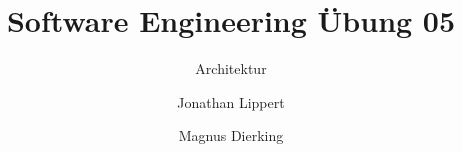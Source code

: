 \documentclass[
	ngerman,
	twoside,
	pdfa=false,
	ruledheaders=section,%
	class=report,%
	thesis={type=Übung},%
	accentcolor=TUDa-9d,%
	custommargins=false,%
	marginpar=false,%
	parskip=half-,%
	fontsize=11pt,%
]{tudapub}
\begin{document}
	\title{Software Engineering Übung 05}
	\subtitle{Architektur}
	\author[J. Lippert \and M. Dierking]
	{Jonathan Lippert \and Magnus Dierking}

	
	\submissiondate{\today}
	

	\maketitle


%	

	\newpage
	\setcounter{page}{1}

     
     

	

	\printbibliography %
	
%	
	
\end{document}
